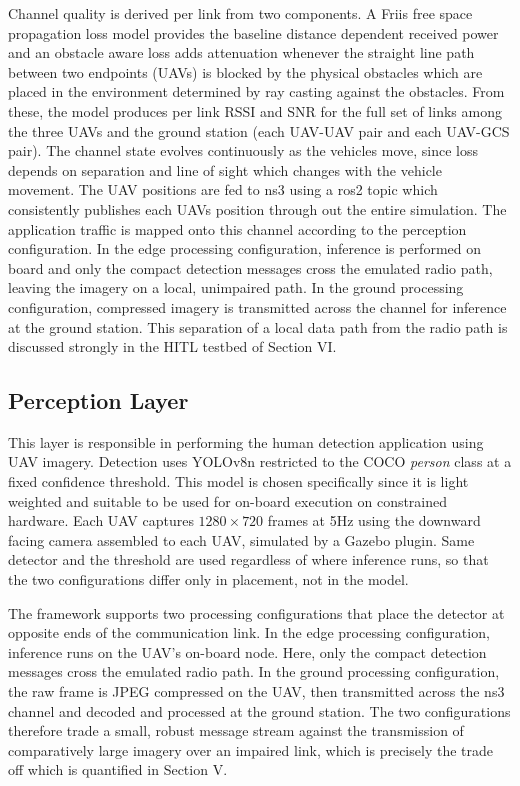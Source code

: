 Channel quality is derived per link from two components. A Friis free space propagation loss model provides the baseline distance dependent received power and an obstacle aware loss adds attenuation whenever the straight line path between two endpoints (UAVs) is blocked by the physical obstacles which are placed in the environment determined by ray casting against the obstacles. From these, the model produces per link RSSI and SNR for the full set of links among the three UAVs and the ground station (each UAV-UAV pair and each UAV-GCS pair). The channel state evolves continuously as the vehicles move, since loss depends on separation and line of sight which changes with the vehicle movement. The UAV positions are fed to ns3 using a ros2 topic which consistently publishes each UAVs position through out the entire simulation. The application traffic is mapped onto this channel according to the perception configuration. In the edge processing configuration, inference is performed on board and only the compact detection messages cross the emulated radio path, leaving the imagery on a local, unimpaired path. In the ground processing configuration, compressed imagery is transmitted across the channel for inference at the ground station. This separation of a local data path from the radio path is discussed strongly in the HITL testbed of Section VI.


\subsection{Perception Layer}

This layer is responsible in performing the human detection application using UAV imagery. Detection uses YOLOv8n restricted to the COCO \emph{person} class at a fixed confidence threshold. This model is chosen specifically since it is light weighted and suitable to be used for on-board execution on constrained hardware. Each UAV captures $1280 \times 720$ frames at 5Hz using the downward facing camera assembled to each UAV, simulated by a Gazebo plugin. Same detector and the threshold are used regardless of where inference runs, so that the two configurations differ only in placement, not in the model.

The framework supports two processing configurations that place the detector at opposite ends of the communication link. In the edge processing configuration, inference runs on the UAV's on-board node. Here, only the compact detection messages cross the emulated radio path. In the ground processing configuration, the raw frame is JPEG compressed on the UAV, then transmitted across the ns3 channel and decoded and processed at the ground station. The two configurations therefore trade a small, robust message stream against the transmission of comparatively large imagery over an impaired link, which is precisely the trade off which is quantified in Section V.

